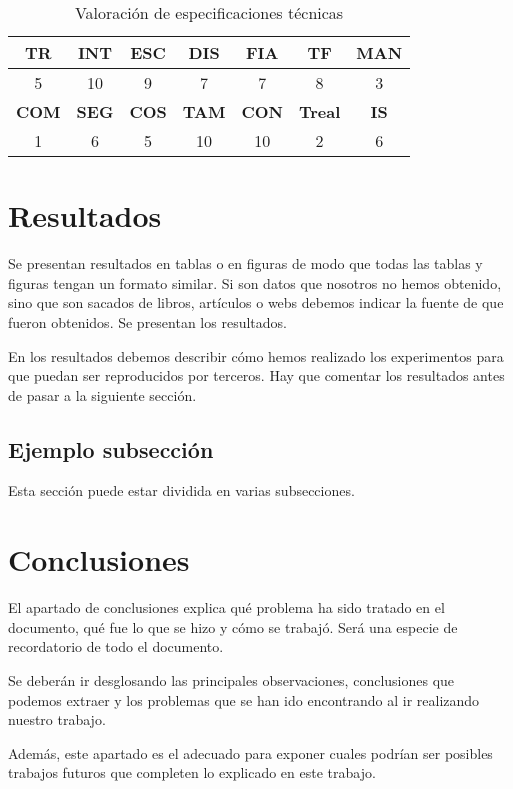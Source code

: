 \documentclass[a4paper,twocolumn]{article}
\begin{document}
\begin{table}[tb]
	{\footnotesize
	\caption{Valoración de especificaciones técnicas}
	\label{tab:valora}
	\centering
	\begin{tabular}{|c|c|c|c|c|c|c|}
		\hline\hline
\textbf{TR} & \textbf{INT} & \textbf{ESC} & \textbf{DIS} & \textbf{FIA} & \textbf{TF} & \textbf{MAN} \\\hline
5 & 10 & 9 & 7 & 7 & 8 & 3 \\\hline\hline
\textbf{COM} & \textbf{SEG} & \textbf{COS} & \textbf{TAM} & \textbf{CON} & \textbf{Treal} & \textbf{IS} \\\hline
1 & 6 & 5 & 10 & 10 & 2 & 6\\\hline
	\end{tabular}
	}
\end{table}
	
	
\section{Resultados}
Se presentan resultados en tablas o en figuras de modo que todas las tablas y figuras tengan un formato similar. Si son datos que nosotros no hemos obtenido, sino que son sacados de libros, artículos o webs debemos indicar la fuente de que fueron obtenidos. Se presentan los resultados.
	
En los resultados debemos describir cómo hemos realizado los experimentos para que puedan ser reproducidos por terceros. Hay que comentar los resultados antes de pasar a la siguiente sección. 
	
\subsection{Ejemplo subsección}
Esta sección puede estar dividida en varias subsecciones. 
	
	
	
\section{Conclusiones}
	
El apartado de conclusiones explica qué problema ha sido tratado en el documento, qué fue lo que se hizo y cómo se trabajó. Será una especie de recordatorio de todo el documento.

Se deberán ir desglosando las principales observaciones, conclusiones que podemos extraer y los problemas que se han ido encontrando al ir realizando nuestro trabajo.

Además, este apartado es el adecuado para exponer cuales podrían ser posibles trabajos futuros que completen lo explicado en este trabajo. 
	

	


	
	
\end{document}
